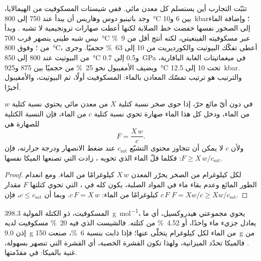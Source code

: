 تثبّت التجارب أين يستسلم كل معدن مائي. ففي شيستات المسكوفيت من
الهيمالايا، وجد باتينيو دوس وهاريس أن  يبدأ عند 750 إلى
\qty{800}{\celsius} بين 6 و\qty{10}{kbar}؛ وإضافة الماء إلى الصخور نفسها خفضت
خط الصلابة لكنها أعطت صهارات ترونجيمية لا تشبه . وبدأ نيس شبه طيني
ينصهر قرب \qty{700}{\celsius} عبر مسكوفيته الفينغيتي، لكنه أنتج أقل
من \qty{9}{\percent} من ؛ وفوق \qty{800}{\celsius}، أعطى تفكّك البيوتيت
والكورديريت من 10 إلى \qty{63}{\percent} حجميًا. وجرى  من البيوتيت
عند 800 إلى \qty{850}{\celsius} و0.5 إلى \qty{0.7}{GPa} في ميغماتيتات
الغابة البافارية، ويضيف الأمفيبول نحو \qty{25}{\percent} من  حجميًا بين 875
و\qty{925}{\celsius} تحت 10 إلى \qty{12.5}{kbar}. والترتيب هو ترتيب تمسّك المعادن بالماء:
المسكوفيت أولًا، ثم البيوتيت، والأمفيبول أخيرًا.

\begin{proposition}\label{prop:b2:crustal-melting:water}
في  دون أيّ مائع حرّ، إذا حوى صخر نسبة كتلية $X$ من
معدن مائي يحتوي نسبة كتلية $w$ من الماء، ودخل كل هذا الماء
صهارة تحوي نسبة كتلية $c$ من الماء، فإن النسبة الكتلية للصهارة هي
\[F = \frac{X\,w}{c}.\]
ولأن $c$ لا يمكن أن تتجاوز محتوى التشبّع $c_{\mathrm{sat}}$ عند ضغط الانصهار
ودرجة حرارته، فإن $F \ge X\,w/c_{\mathrm{sat}}$: فكلما قلّ الماء الذي تحويه ، زادت
 التي تصنعها الميكا نفسها.
\end{proposition}

\begin{proof}
لكل كيلوغرام من الصخر يحرّر المعدن $X\,w$ كيلوغرامًا من الماء. ومع انعدام الطور المائع
وعدم بقاء ماء في المواد الصلبة، يكون كله في ، التي تحوي كتلتها $F$ مقدار $c\,F$
كيلوغرامًا من الماء: $c\,F = X\,w$. وبما أن $c \le c_{\mathrm{sat}}$، فإن $F = Xw/c \ge
Xw/c_{\mathrm{sat}}$.
\end{proof}

المسكوفيت،  ذو الكتلة المولية \qty{398.3}{\gram\per\mole}، يحوي مجموعتي
هيدروكسيل، أي ما يعادل جزيء ماء واحدًا، أو \qty{4.52}{\percent} من
كتلته. فالشيست الذي فيه \qty{20}{\percent} مسكوفيت لديه إذن \qty{9.0}{\gram} من الماء
لكل كيلوغرام يتخلّى عنها؛ فإذا ذابت بنسبة \qty{6}{\percent}، صنعت \qty{150}{\gram} من
. فالميكا تحدّد الميزانية، ولهذا تكون القشرة الخصبة، أي القشرة التي تنصهر بسهولة،
غنية بالميكا:  في مقدّمتها.

